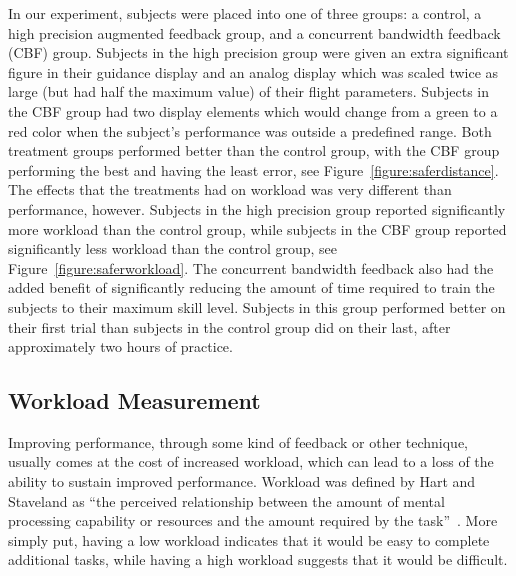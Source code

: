 \documentclass[float=false, crop=false]{standalone}
\begin{document}
In our experiment, subjects were placed into one of three groups: a control, a high precision augmented feedback group, and a concurrent bandwidth feedback (CBF) group.
Subjects in the high precision group were given an extra significant figure in their guidance display and an analog display which was scaled twice as large (but had half the maximum value) of their flight parameters.
Subjects in the CBF group had two display elements which would change from a green to a red color when the subject's performance was outside a predefined range.
Both treatment groups performed better than the control group, with the CBF group performing the best and having the least error, see Figure~\ref{figure:saferdistance}.
The effects that the treatments had on workload was very different than performance, however.
Subjects in the high precision group reported significantly more workload than the control group, while subjects in the CBF group reported significantly less workload than the control group, see Figure~\ref{figure:saferworkload}.
The concurrent bandwidth feedback also had the added benefit of significantly reducing the amount of time required to train the subjects to their maximum skill level.
Subjects in this group performed better on their first trial than subjects in the control group did on their last, after approximately two hours of practice.

\subsection{Workload Measurement}
Improving performance, through some kind of feedback or other technique, usually comes at the cost of increased workload, which can lead to a loss of the ability to sustain improved performance.
Workload was defined by Hart and Staveland as ``the perceived relationship between the amount of mental processing capability or resources and the amount required by the task''~\cite{Hart1988}.
More simply put, having a low workload indicates that it would be easy to complete additional tasks, while having a high workload suggests that it would be difficult.
\end{document}
